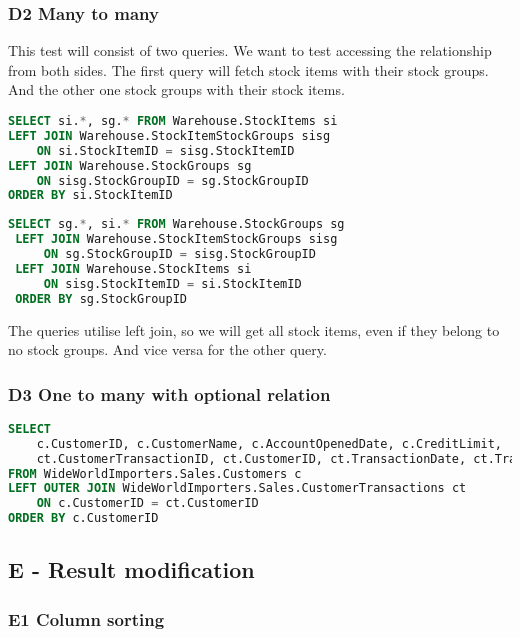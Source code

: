 \subsubsection*{D2 Many to many}

This test will consist of two queries. We want to test accessing the relationship from both sides. The first query will fetch stock items with their stock groups. And the other one stock groups with their stock items.
\begin{lstlisting}[language=SQL]
SELECT si.*, sg.* FROM Warehouse.StockItems si
LEFT JOIN Warehouse.StockItemStockGroups sisg
    ON si.StockItemID = sisg.StockItemID
LEFT JOIN Warehouse.StockGroups sg
    ON sisg.StockGroupID = sg.StockGroupID
ORDER BY si.StockItemID
\end{lstlisting}
\begin{lstlisting}[language=SQL]
 SELECT sg.*, si.* FROM Warehouse.StockGroups sg
 LEFT JOIN Warehouse.StockItemStockGroups sisg
     ON sg.StockGroupID = sisg.StockGroupID
 LEFT JOIN Warehouse.StockItems si
     ON sisg.StockItemID = si.StockItemID
 ORDER BY sg.StockGroupID
\end{lstlisting}
The queries utilise left join, so we will get all stock items, even if they belong to no stock groups. And vice versa for the other query.

\subsubsection*{D3 One to many with optional relation}

\begin{lstlisting}[language=SQL]
SELECT 
    c.CustomerID, c.CustomerName, c.AccountOpenedDate, c.CreditLimit, 
    ct.CustomerTransactionID, ct.CustomerID, ct.TransactionDate, ct.TransactionAmount
FROM WideWorldImporters.Sales.Customers c
LEFT OUTER JOIN WideWorldImporters.Sales.CustomerTransactions ct
    ON c.CustomerID = ct.CustomerID
ORDER BY c.CustomerID
\end{lstlisting}

\subsection{E - Result modification}

\subsubsection*{E1 Column sorting}

